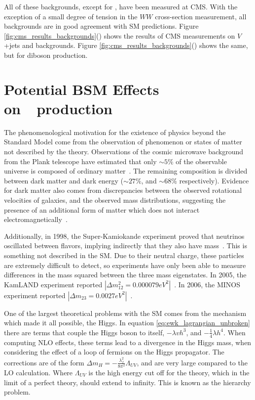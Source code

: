 \par All of these backgrounds, except for \ttbb, have been measured at CMS.  With the
exception of a small degree of tension in the $WW$ cross-section
measurement, all backgrounds are in good agreement with SM
predictions.  Figure
\ref{fig:cms_results_backgrounds}()
shows the results of CMS measurements on $V$+jets and \ttjets
backgrounds.  Figure
\ref{fig:cms_results_backgrounds}() shows
the same, but for diboson production.  
 

\section{Potential BSM Effects on~\ttH~production}
\label{bsm_effects_overview}

\par The phenomenological motivation for the existence of physics beyond
the Standard Model come from the observation of phenomenon or states
of matter not described by the theory.  Observations of the cosmic microwave background
from the Plank telescope have estimated that only $\sim5\%$ of the
observable universe is composed of ordinary
matter~\cite{BSM_Planck}. The remaining composition is divided between  
dark matter and dark energy ($\sim27\%$, and $\sim68\%$ respectively).  Evidence for
dark matter also comes from discrepancies between the observed
rotational velocities of galaxies, and the observed mass
distributions, suggesting the presence of an additional form of matter
which does not interact
electromagnetically~\cite{BSM_Rubin_DM_GalaxyRotations}.

\par Additionally, in 1998, the Super-Kamiokande experiment proved that
neutrinos oscillated between flavors, implying indirectly that they
also have mass~\cite{BSM_superK}.  This is something not described in
the SM.  Due to their neutral charge, these
particles  are extremely difficult to detect, so experiments have only
been able to measure differences in the mass squared between the three
mass eigenstates.  In 2005, the KamLAND experiment reported
$|{\Delta}m^{2}_{12}=0.000079
eV^{2}|$~\cite{BSM_neutrinoDeltaM12_kamland}.  In 2006, the MINOS
experiment reported
$|{\Delta}m_{23}=0.0027 eV^{2}|$~\cite{BSM_neutrinoDeltaM23_minos}.

\par One of the largest theoretical problems with the SM
comes from the mechanism which made it all possible, the Higgs.  In
equation \ref{eq:ewk_lagrangian_unbroken} there are terms that couple
the Higgs boson to itself, $-{\lambda}vh^{3}$, and
$-\frac{1}{4}{\lambda}h^{4}$.  When computing NLO effects, these terms
lead to a divergence in the Higgs mass, when considering the effect of
a loop of fermions on the Higgs propagator.  The corrections are of the form ${\Delta}m_{H} =
-\frac{\lambda_{f}^{2}}{8\pi^{2}}\Lambda_{UV}$, and are very large
compared to the LO calculation.  Where $\Lambda_{UV}$
is the high energy cut off for the theory, which in the limit of a
perfect theory, should extend to infinity.  This is known as the
hierarchy problem.  

